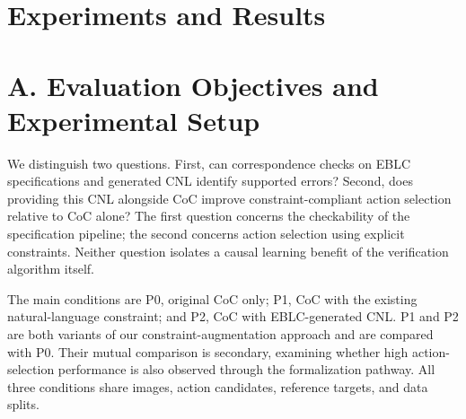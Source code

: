 \documentclass[11pt,a4paper]{article}
\begin{document}
\section*{Experiments and Results}

\section*{A. Evaluation Objectives and Experimental Setup}

We distinguish two questions. First, can correspondence checks on EBLC specifications and generated CNL identify supported errors? Second, does providing this CNL alongside CoC improve constraint-compliant action selection relative to CoC alone? The first question concerns the checkability of the specification pipeline; the second concerns action selection using explicit constraints. Neither question isolates a causal learning benefit of the verification algorithm itself.\par

The main conditions are P0, original CoC only; P1, CoC with the existing natural-language constraint; and P2, CoC with EBLC-generated CNL. P1 and P2 are both variants of our constraint-augmentation approach and are compared with P0. Their mutual comparison is secondary, examining whether high action-selection performance is also observed through the formalization pathway. All three conditions share images, action candidates, reference targets, and data splits.\par
\end{document}
